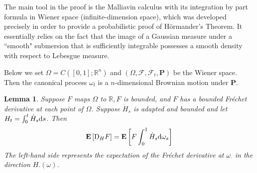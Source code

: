 \documentclass[twoside, 12pt]{book}
\numberwithin{equation}{chapter}
\newtheorem{lemma}[theorem]{Lemma}
\def\cF{{\mathcal F}}
\def\mR{{\mathbb R}}
\def\bP{{\mathbf P}}
\def\d{\text{\rm{d}}}
\begin{document}
    The main tool in the proof is the Malliavin calculus with its integration by part formula in Wiener space (infinite-dimension space), which was developed precisely in order to provide a probabilistic proof of Hörmander's Theorem. It essentially relies on the fact that the image of a Gaussian measure under a ``smooth" submersion that is sufficiently integrable possesses a smooth density with respect to Lebesgue measure. 
    
    Below we set $\Omega=C([0,1];\mR^n)$ and $(\Omega, \cF, \cF_t, \bP)$ be the Wiener space. Then the canonical process $\omega_t$ is a $n$-dimensional Brownian motion under $\bP$. 
    
    \begin{lemma}\label{lem:IBP}
       Suppose $F$ maps $\Omega$ to $\mathbb{R}, F$ is bounded, and $F$ has a bounded Fréchet derivative at each point of $\Omega$. Suppose $\dot H_s$ is adapted and bounded and let $H_t=\int_0^t \dot{H}_s \d s$. Then
       \begin{equation}\label{eq:IBP}
       	    \mathbf{E}\left[\mathrm{D}_H F \right]=\mathbf{E}\left[F \int_0^1 \dot H_s \d \omega_s\right]
       \end{equation}
       The left-hand side represents the expectation of the Fréchet derivative at $\omega_{\cdot}$ in the direction $H.(\omega)$.
    \end{lemma}
\end{document}
